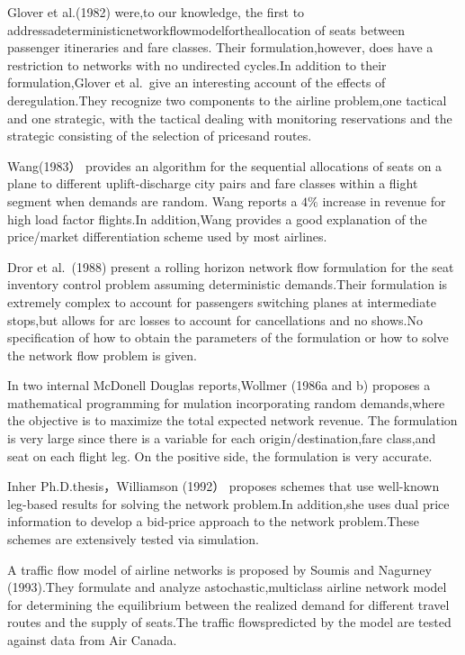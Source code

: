 Glover et al.(1982) were,to our knowledge, the first to
addressadeterministicnetworkflowmodelfortheallocation of seats between
passenger itineraries and fare classes. Their formulation,however, does
have a restriction to networks with no undirected cycles.In addition to
their formulation,Glover et al.~give an interesting account of the
effects of deregulation.They recognize two components to the airline
problem,one tactical and one strategic, with the tactical dealing with
monitoring reservations and the strategic consisting of the selection of
pricesand routes.

Wang(1983） provides an algorithm for the sequential allocations of
seats on a plane to different uplift-discharge city pairs and fare
classes within a flight segment when demands are random. Wang reports a
\(4 \%\) increase in revenue for high load factor flights.In
addition,Wang provides a good explanation of the price/market
differentiation scheme used by most airlines.

Dror et al.~(1988) present a rolling horizon network flow formulation
for the seat inventory control problem assuming deterministic
demands.Their formulation is extremely complex to account for passengers
switching planes at intermediate stops,but allows for arc losses to
account for cancellations and no shows.No specification of how to obtain
the parameters of the formulation or how to solve the network flow
problem is given.

In two internal McDonell Douglas reports,Wollmer (1986a and b) proposes
a mathematical programming for mulation incorporating random
demands,where the objective is to maximize the total expected network
revenue. The formulation is very large since there is a variable for
each origin/destination,fare class,and seat on each flight leg. On the
positive side, the formulation is very accurate.

Inher Ph.D.thesis，Williamson (1992） proposes schemes that use
well-known leg-based results for solving the network problem.In
addition,she uses dual price information to develop a bid-price approach
to the network problem.These schemes are extensively tested via
simulation.

A traffic flow model of airline networks is proposed by Soumis and
Nagurney (1993).They formulate and analyze astochastic,multiclass
airline network model for determining the equilibrium between the
realized demand for different travel routes and the supply of seats.The
traffic flowspredicted by the model are tested against data from Air
Canada.

